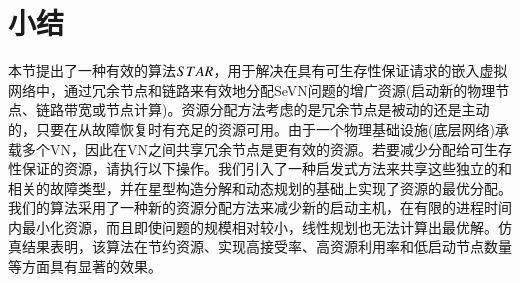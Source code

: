 \section{小结}
本节提出了一种有效的算法$STAR$，用于解决在具有可生存性保证请求的嵌入虚拟网络中，通过冗余节点和链路来有效地分配SeVN问题的增广资源(启动新的物理节点、链路带宽或节点计算)。资源分配方法考虑的是冗余节点是被动的还是主动的，只要在从故障恢复时有充足的资源可用。由于一个物理基础设施(底层网络)承载多个VN，因此在VN之间共享冗余节点是更有效的资源。若要减少分配给可生存性保证的资源，请执行以下操作。我们引入了一种启发式方法来共享这些独立的和相关的故障类型，并在星型构造分解和动态规划的基础上实现了资源的最优分配。我们的算法采用了一种新的资源分配方法来减少新的启动主机，在有限的进程时间内最小化资源，而且即使问题的规模相对较小，线性规划也无法计算出最优解。仿真结果表明，该算法在节约资源、实现高接受率、高资源利用率和低启动节点数量等方面具有显著的效果。
